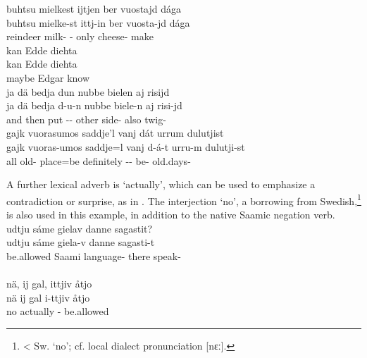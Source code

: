 \ea\label{ADVsEx1}%
\glll	buhtsu mielkest ijtjen ber vuostajd dága\\
	buhtsu mielke-st ittj-in ber vuosta-jd dága\\
	reindeer\BS{} milk- - only cheese- make\BS{}\\\nopagebreak
	
\z
\ea\label{ADVsEx3}%
\glll	kan Edde diehta\\
	kan Edde diehta\\
	maybe Edgar\BS{} know\BS{}\\\nopagebreak
{}	
\z
\ea\label{ADVsEx3b}%
\glll	ja dä bedja dun nubbe bielen aj risijd\\
	ja dä bedja d-u-n nubbe biele-n aj risi-jd\\
	and then put\BS{} -- other side- also twig-\\\nopagebreak
{}	
\z
\ea\label{ADVsEx5}
\glll	gajk vuorasumos saddje'l vanj dát urrum dulutjist\\
	gajk vuoras-umos saddje=l vanj d-á-t urru-m dulutji-st\\
	all old- place\BS{}=be\BS{} definitely -- be- old.days-\\\nopagebreak
{}	
\z

A further lexical adverb is  ‘actually’, which can be used to emphasize a contradiction or surprise, as in . The interjection  ‘no’, a borrowing from Swedish,\footnote{< Sw.  ‘no’; cf. local dialect pronunciation [nɛː].} 
is also used in this example, in addition to the native Saamic negation verb. 
\ea\label{particleEx6}
\glll	{} udtju sáme gielav danne sagastit?\\
	{} udtju sáme giela-v danne sagasti-t\\
	{} be.allowed\BS{} Saami\BS{} language- there speak-\\\nopagebreak
{}\\
\glll	{} nä, ij gal, ittjiv åtjo\\
	{} nä ij gal i-ttjiv åtjo\\
	{} no \BS{} actually - be.allowed\BS{}\\\nopagebreak
{}	
\z

